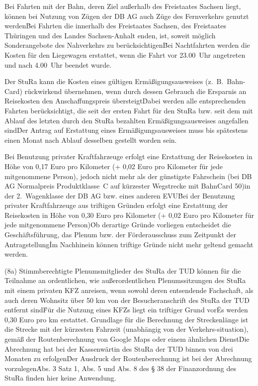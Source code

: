 {\begin{multicols}{2}
\Abs \Satz Bei Fahrten mit der Bahn, deren Ziel außerhalb des Freistaates Sachsen liegt, können bei Nutzung von Zügen der DB AG auch Züge des Fernverkehrs genutzt werden\. Bei Fahrten die innerhalb des Freistaates Sachsen, des Freistaates Thüringen und des Landes Sachsen-Anhalt enden, ist, soweit möglich Sonderangebote des Nahverkehrs zu berücksichtigen\. Bei Nachtfahrten werden die Kosten für den Liegewagen erstattet, wenn die Fahrt vor 23.00~Uhr angetreten und nach 4.00~Uhr beendet wurde.

\Abs \Satz Der StuRa kann die Kosten eines gültigen Ermäßigungsausweises (z.~B.~Bahn-Card) rückwirkend übernehmen, wenn durch dessen Gebrauch die Ersparnis an Reisekosten den Anschaffungspreis übersteigt\. Dabei werden alle entsprechenden Fahrten berücksichtigt, die seit der ersten Fahrt für den StuRa bzw. seit dem mit Ablauf des letzten durch den StuRa bezahlten Ermäßigungsausweises angefallen sind\. Der Antrag auf Erstattung eines Ermäßigungsausweises muss bis spätestens einen Monat nach Ablauf desselben gestellt worden sein.

\Abs \Satz Bei  Benutzung  privater   Kraftfahrzeuge  erfolgt  eine  Erstattung  der Reisekosten in Höhe von 0,17 Euro pro Kilometer (+ 0,02 Euro pro Kilometer für jede mitgenommene Person), jedoch nicht  mehr  als  der  günstigste Fahrschein (bei DB AG Normalpreis Produktklasse~C auf kürzester Wegstrecke mit BahnCard 50)in der 2.~Wagenklasse der DB AG bzw. eines anderen EVU\. Bei der Benutzung privater Kraftfahrzeuge aus triftigen Gründen erfolgt eine Erstattung der Reisekosten in Höhe von 0,30 Euro pro Kilometer (+ 0,02 Euro pro Kilometer für jede mitgenommene Person)\. Ob derartige Gründe vorliegen entscheidet die Geschäftsführung, das Plenum bzw. der Förderausschuss zum Zeitpunkt der Antragstellung\. Im Nachhinein können triftige Gründe nicht mehr geltend gemacht werden. \
 
(8a) \Satz Stimmberechtigte Plenumsmitglieder des StuRa der TUD können für die Teilnahme an ordentlichen, wie außerordentlichen Plenumssitzungen des StuRa mit einem privaten KFZ anreisen, wenn sowohl deren entsendende Fachschaft, als auch deren Wohnsitz über 50 km von der Besucheranschrift des StuRa der TUD entfernt sind\. Für die Nutzung eines KFZs liegt ein triftiger Grund vor\. Es werden 0,30 Euro pro km erstattet. Grundlage für die Berechnung der Streckenlänge ist die Strecke mit der kürzesten Fahrzeit (unabhängig von der Verkehrs-situation), gemäß der Routenberechnung von Google Maps oder einem ähnlichen Dienst\. Die Abrechnung hat bei der Kassenwärtin des StuRa der TUD binnen von drei Monaten zu erfolgen\. Der Ausdruck der Routenberechnung ist bei der Abrechnung vorzulegen\. Abs. 3 Satz 1, Abs. 5 und Abs. 8 des § 38 der Finanzordnung des StuRa finden hier keine Anwendung.


\end{multicols}}
